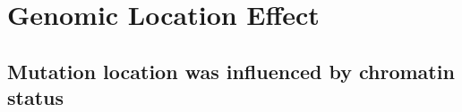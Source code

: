 \chapter{Genomic Location Effect}\label{gle}


\section{Mutation location was influenced by chromatin status}\label{gle:chromatin}

